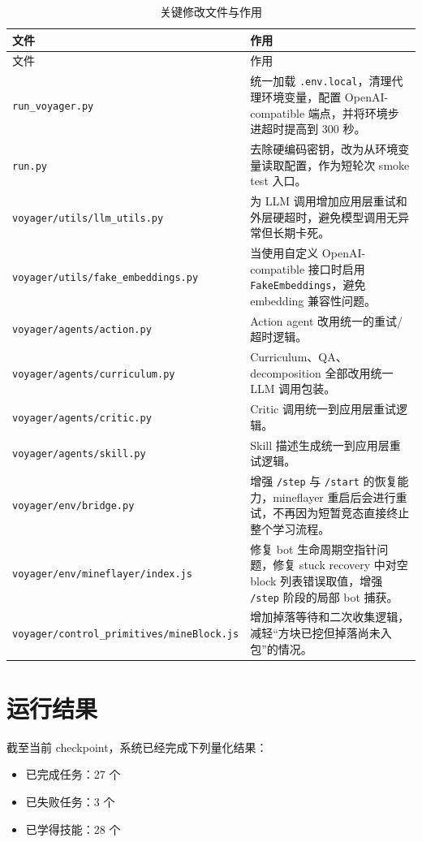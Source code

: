 \documentclass[11pt,a4paper]{ctexart}
\begin{document}
\begin{longtable}{p{}p{}}
\caption{关键修改文件与作用}\label{tab:files}\\
\toprule
文件 & 作用 \\
\midrule
\endfirsthead
\toprule
文件 & 作用 \\
\midrule
\endhead
\texttt{run\_voyager.py} & 统一加载 \texttt{.env.local}，清理代理环境变量，配置 OpenAI-compatible 端点，并将环境步进超时提高到 300 秒。 \\
\texttt{run.py} & 去除硬编码密钥，改为从环境变量读取配置，作为短轮次 smoke test 入口。 \\
\texttt{voyager/utils/llm\_utils.py} & 为 LLM 调用增加应用层重试和外层硬超时，避免模型调用无异常但长期卡死。 \\
\texttt{voyager/utils/fake\_embeddings.py} & 当使用自定义 OpenAI-compatible 接口时启用 \texttt{FakeEmbeddings}，避免 embedding 兼容性问题。 \\
\texttt{voyager/agents/action.py} & Action agent 改用统一的重试/超时逻辑。 \\
\texttt{voyager/agents/curriculum.py} & Curriculum、QA、decomposition 全部改用统一 LLM 调用包装。 \\
\texttt{voyager/agents/critic.py} & Critic 调用统一到应用层重试逻辑。 \\
\texttt{voyager/agents/skill.py} & Skill 描述生成统一到应用层重试逻辑。 \\
\texttt{voyager/env/bridge.py} & 增强 \texttt{/step} 与 \texttt{/start} 的恢复能力，mineflayer 重启后会进行重试，不再因为短暂竞态直接终止整个学习流程。 \\
\texttt{voyager/env/mineflayer/index.js} & 修复 bot 生命周期空指针问题，修复 stuck recovery 中对空 block 列表错误取值，增强 \texttt{/step} 阶段的局部 bot 捕获。 \\
\texttt{voyager/control\_primitives/mineBlock.js} & 增加掉落等待和二次收集逻辑，减轻“方块已挖但掉落尚未入包”的情况。 \\
\bottomrule
\end{longtable}

\section{运行结果}

截至当前 checkpoint，系统已经完成下列量化结果：

\begin{itemize}
  \item 已完成任务：27 个
  \item 已失败任务：3 个
  \item 已学得技能：28 个
\end{itemize}
\end{document}
